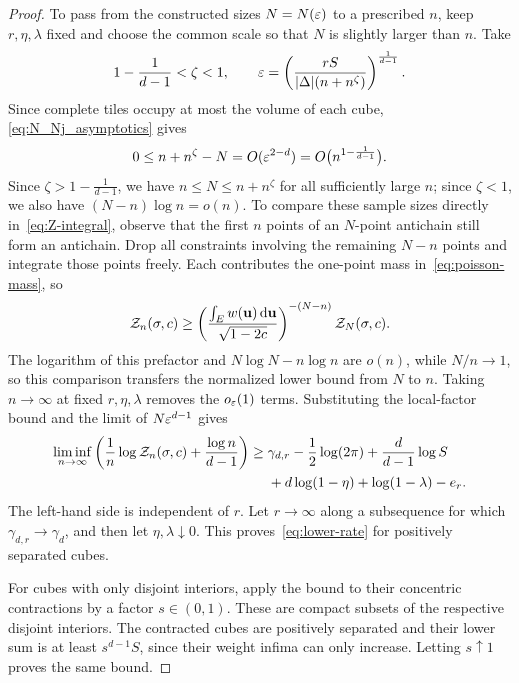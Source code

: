 \documentclass[11pt,letterpaper]{article}
\begin{document}
\begin{proof}
      To pass from the constructed sizes $N=N(\varepsilon)$ to a prescribed $n$, keep $r,\eta,\lambda$ fixed and choose the common scale so that $N$ is slightly larger than $n$. Take
      \[
            1-\frac1{d-1}<\zeta<1,
            \qquad
            \varepsilon=\left(\frac{rS}{|\Delta|(n+n^\zeta)}\right)^{\frac1{d-1}}.
      \]
      Since complete tiles occupy at most the volume of each cube, \eqref{eq:N_Nj_asymptotics} gives%
      \[
            0\le n+n^\zeta-N
            =O(\varepsilon^{2-d})
            =O\bigl(n^{1-\frac1{d-1}}\bigr).
      \]
      Since $\zeta>1-\frac1{d-1}$, we have $n\le N\le n+n^\zeta$ for all sufficiently large $n$; since $\zeta<1$, we also have $(N-n)\log n=o(n)$. To compare these sample sizes directly in~\eqref{eq:Z-integral}, observe that the first $n$ points of an $N$-point antichain still form an antichain. Drop all constraints involving the remaining $N-n$ points and integrate those points freely. Each contributes the one-point mass in~\eqref{eq:poisson-mass}, so
      \begin{equation*}
            \mathcal Z_n(\sigma,c)\ge
            \left(\frac{\int_Ew(\mathbf u)\,\mathrm d\mathbf u}{\sqrt{1-2c}}\right)^{-(N-n)}
            \mathcal Z_N(\sigma,c).
      \end{equation*}
      The logarithm of this prefactor and $N\log N-n\log n$ are $o(n)$, while $N/n\to1$, so this comparison transfers the normalized lower bound from $N$ to $n$. Taking $n\to\infty$ at fixed $r,\eta,\lambda$ removes the $o_\varepsilon(1)$ terms. Substituting the local-factor bound and the limit of $N\varepsilon^{d-1}$ gives
      \[
            \begin{aligned}
                  \liminf_{n\to\infty}
                  \left(\frac1n\log\mathcal Z_n(\sigma,c)+\frac{\log n}{d-1}\right)
                  \ge{} & \gamma_{d,r}-\frac12\log(2\pi)
                  +\frac d{d-1}\log S                         \\
                        & +d\log(1-\eta)+\log(1-\lambda)-e_r.
            \end{aligned}
      \]
      The left-hand side is independent of $r$. Let $r\to\infty$ along a subsequence for which $\gamma_{d,r}\to\gamma_d$, and then let $\eta,\lambda\downarrow0$. This proves~\eqref{eq:lower-rate} for positively separated cubes.

      For cubes with only disjoint interiors, apply the bound to their concentric contractions by a factor $s\in(0,1)$. These are compact subsets of the respective disjoint interiors. The contracted cubes are positively separated and their lower sum is at least $s^{d-1}S$, since their weight infima can only increase. Letting $s\uparrow1$ proves the same bound.
\end{proof}
\end{document}
